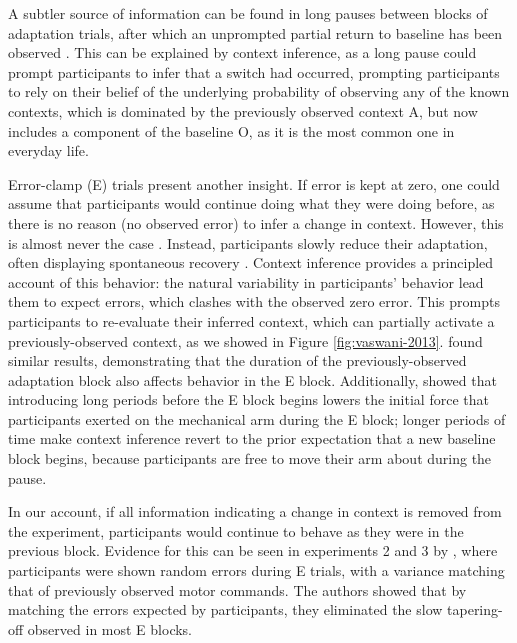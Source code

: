 \documentclass[a4paper,doc,floatsintext,natbib]{apa6}
\def \fref #1{Figure \ref{#1}}     %
\begin{document}
A subtler source of information can be found in long pauses between blocks of adaptation trials, after which an unprompted partial return to baseline has been observed \cite{Ethier_Spontaneous_2008}. This can be explained by context inference, as a long pause could prompt participants to infer that a switch had occurred, prompting participants to rely on their belief of the underlying probability of observing any of the known contexts, which is dominated by the previously observed context A, but now includes a component of the baseline O, as it is the most common one in everyday life.

Error-clamp (E) trials present another insight. If error is kept at zero, one could assume that participants would continue doing what they were doing before, as there is no reason (no observed error) to infer a change in context. However, this is almost never the case \cite[e.g.][]{Smith_Interacting_2006,Ethier_Spontaneous_2008,Forano_Timescales_2020,Vaswani_Decay_2013,Scheidt_Persistence_2000,Pekny_Protection_2011}. Instead, participants slowly reduce their adaptation, often displaying spontaneous recovery \cite[e.g.][]{Smith_Interacting_2006}. Context inference provides a principled account of this behavior: the natural variability in participants' behavior lead them to expect errors, which clashes with the observed zero error. This prompts participants to re-evaluate their inferred context, which can partially activate a previously-observed context, as we showed in \fref{fig:vaswani-2013}. \cite{Pekny_Protection_2011} found similar results, demonstrating that the duration of the previously-observed adaptation block also affects behavior in the E block. Additionally, \cite{Criscimagna-Hemminger_Consolidation_2008} showed that introducing long periods before the E block begins lowers the initial force that participants exerted on the mechanical arm during the E block; longer periods of time make context inference revert to the prior expectation that a new baseline block begins, because participants are free to move their arm about during the pause.

In our account, if all information indicating a change in context is removed from the experiment, participants would continue to behave as they were in the previous block. Evidence for this can be seen in experiments 2 and 3 by \cite{Vaswani_Decay_2013}, where participants were shown random errors during E trials, with a variance matching that of previously observed motor commands. The authors showed that by matching the errors expected by participants, they eliminated the slow tapering-off observed in most E blocks.
\end{document}
